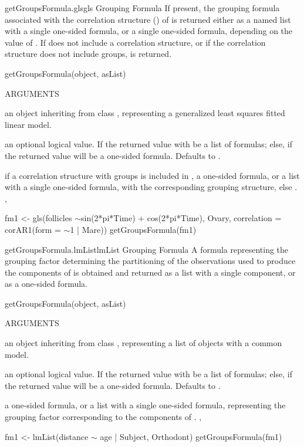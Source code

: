 \documentclass[pdftex]{article} \usepackage{url,graphicx}
\renewcommand{\Twiddle}{\mbox{\(\sim\)}}
\begin{document}
\begin{Helpfile}{getGroupsFormula.gls}{gls Grouping Formula}
If present, the grouping formula associated with the correlation
structure () of  is returned either as
a named list with a single one-sided formula, or a single one-sided
formula, depending on the value of . If 
does not include a correlation structure, or if the correlation
structure does not include groups,  is returned.
\begin{Example}
getGroupsFormula(object, asList)
\end{Example}
\begin{Argument}{ARGUMENTS}
\item[\Co{object:}]
an object inheriting from class , representing
a generalized least squares fitted linear model.
\item[\Co{asList:}]
an optional logical value. If  the returned
value with be a list of formulas; else, if  the returned
value will be a one-sided formula. Defaults to .
\end{Argument}
if a correlation structure with groups is included in , a
one-sided formula, or a list with a single one-sided formula, with the
corresponding grouping structure, else .
, 
\need 15pt
\vspace{-16pt} 
\begin{Example}
fm1 <- gls(follicles \Twiddle sin(2*pi*Time) + cos(2*pi*Time), Ovary,
           correlation = corAR1(form = \Twiddle 1 | Mare))
getGroupsFormula(fm1)
\end{Example}
\end{Helpfile}
\begin{Helpfile}{getGroupsFormula.lmList}{lmList Grouping Formula}
A formula representing the grouping factor determining the
partitioning of the observations used to produce the 
components of  is obtained and returned as a list with a
single component, or as a one-sided formula.
\begin{Example}
getGroupsFormula(object, asList)
\end{Example}
\begin{Argument}{ARGUMENTS}
\item[\Co{object:}]
an object inheriting from class , representing
a list of  objects with a common model.
\item[\Co{asList:}]
an optional logical value. If  the returned
value with be a list of formulas; else, if  the returned
value will be a one-sided formula. Defaults to .
\end{Argument}
a one-sided formula, or a list with a single one-sided formula,
representing the grouping factor corresponding to the 
components of .
, 
\need 15pt
\vspace{-16pt}
\begin{Example}
fm1 <- lmList(distance {\Twiddle} age | Subject, Orthodont)
getGroupsFormula(fm1)
\end{Example}
\end{Helpfile}
\end{document}

